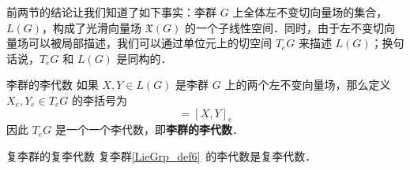 前两节的结论让我们知道了如下事实：李群 $G$ 上全体左不变切向量场的集合，$L(G)$，构成了光滑向量场 $\mathfrak{X}(G)$ 的一个子线性空间．同时，由于左不变切向量场可以被局部描述，我们可以通过单位元上的切空间 $T_eG$ 来描述 $L(G)$；换句话说，$T_eG$ 和 $L(G)$ 是同构的．

\begin{definition}{李群的李代数}
如果 $X, Y\in L(G)$ 是李群 $G$ 上的两个左不变向量场，那么定义 $X_e, Y_e\in T_eG$ 的李括号为
\begin{equation}
[X_e, Y_e]=[X, Y]_e
\end{equation}
因此 $T_e G$ 是一个一个李代数，即\textbf{李群的李代数}．
\end{definition}


\begin{theorem}{复李群的复李代数}
复李群\autoref{LieGrp_def6}~的李代数是复李代数．
\end{theorem}











